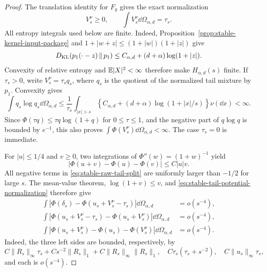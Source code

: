 \begin{proof}
The translation identity for \(F_y\) gives the exact normalization
\begin{equation}\label{eq:stable-tail-potential-normalization}
 V_s^\nu\ge0,\qquad
 \int V_s^\nu\dd\Omega_{\alpha,d}=\tau_s.
\end{equation}
All entropy integrals used below are finite.  Indeed,
Proposition~\ref{prop:stable-kernel-input-package} and
\(1+|w+z|\le(1+|w|)(1+|z|)\) give
\[
 D_{\rm KL}\!\left(p_1(\mathord\cdot-z)\,\middle\|\,p_1\right)
 \le C_{\alpha,d}+(d+\alpha)\log(1+|z|).
\]
Convexity of relative entropy and \(\mathbb{E}|X|^2<\infty\) therefore make
\(H_{\alpha,d}(s)\) finite.  If \(\tau_s>0\), write
\(V_s^\nu=\tau_s q_s\), where \(q_s\) is the quotient of the normalized
tail mixture by \(p_1\).  Convexity gives
\[
 \int q_s\log q_s\dd\Omega_{\alpha,d}
 \le \frac1{\tau_s}\int_{|x|>s}
 \left\{C_{\alpha,d}+(d+\alpha)\log(1+|x|/s)\right\}\nu(\dd x)<\infty.
\]
Since \(\Phi(\tau q)\le\tau q\log(1+q)\) for \(0\le\tau\le1\), and the
negative part of \(q\log q\) is bounded by \(e^{-1}\), this also proves
\(\int\Phi(V_s^\nu)\dd\Omega_{\alpha,d}<\infty\).  The case \(\tau_s=0\)
is immediate.

For \(|u|\le1/4\) and \(v\ge0\), two integrations of
\(\Phi''(w)=(1+w)^{-1}\) yield
\begin{equation}\label{eq:stable-phi-interaction}
 |\Phi(u+v)-\Phi(u)-\Phi(v)|\le C|u|v.
\end{equation}
All negative terms in \eqref{eq:stable-raw-tail-split} are uniformly larger
than \(-1/2\) for large \(s\).  The mean-value theorem,
\(\log(1+v)\le v\), and
\eqref{eq:stable-tail-potential-normalization} therefore give
\begin{align}
 \int|\Phi(\delta_s)-\Phi(u_s+V_s^\nu-\tau_s)|
       \dd\Omega_{\alpha,d}&=o(s^{-4}),\label{eq:stable-remove-remainder}\\
 \int|\Phi(u_s+V_s^\nu-\tau_s)-\Phi(u_s+V_s^\nu)|
       \dd\Omega_{\alpha,d}&=o(s^{-4}),\label{eq:stable-remove-mass}\\
 \int|\Phi(u_s+V_s^\nu)-\Phi(u_s)-\Phi(V_s^\nu)|
       \dd\Omega_{\alpha,d}&=o(s^{-4}).\label{eq:stable-remove-interaction}
\end{align}
Indeed, the three left sides are bounded, respectively, by
\[
 C\|R_s\|_\infty\tau_s+Cs^{-2}\|R_s\|_1
 +C\|R_s\|_\infty\|R_s\|_1,
 \quad C\tau_s(\tau_s+s^{-2}),
 \quad C\|u_s\|_\infty\tau_s,
\]
and each is \(o(s^{-4})\).


\end{proof}
